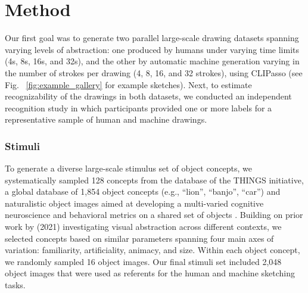 \documentclass[10pt,letterpaper]{article}
\begin{document}
\section{Method}
Our first goal was to generate two parallel large-scale drawing datasets spanning varying levels of abstraction: one produced by humans under varying time limits (4s, 8s, 16s, and 32s), and the other by automatic machine generation varying in the number of strokes per drawing (4, 8, 16, and 32 strokes), using CLIPasso \cite{vinker2022clipasso} (see Fig. ~\ref{fig:example_gallery} for example sketches).   
Next, to estimate recognizability of the drawings in both datasets, we conducted an independent recognition study in which participants provided one or more labels for a representative sample of human and machine drawings.



\subsubsection{Stimuli}
To generate a diverse large-scale stimulus set of object concepts, we systematically sampled 128 concepts from the database of the THINGS initiative, a global database of 1,854 object concepts (e.g., ``lion'', ``banjo'', ``car'') and naturalistic object images aimed at developing a multi-varied cognitive neuroscience and behavioral metrics on a shared set of objects \cite{hebart2019things}. 
Building on prior work by \citeauthor{yang2021visual} (2021) investigating visual abstraction across different contexts, we selected concepts based on similar parameters spanning four main axes of variation: familiarity, artificiality, animacy, and size. 
Within each object concept, we randomly sampled 16 object images. 
Our final stimuli set included 2,048 object images that were used as referents for the human and machine sketching tasks.
\end{document}
